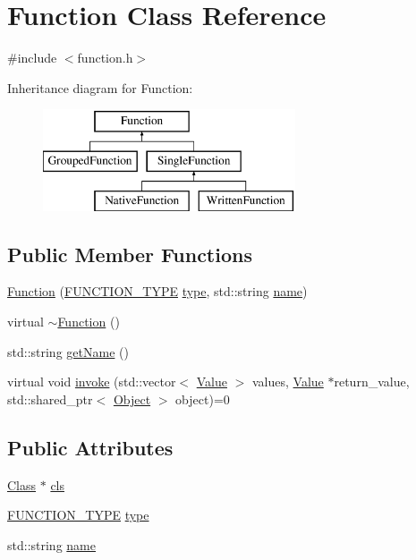 \hypertarget{classFunction}{}\section{Function Class Reference}
\label{classFunction}


{\ttfamily \#include $<$function.\+h$>$}

Inheritance diagram for Function\+:\begin{figure}[H]
\begin{center}
\leavevmode
\includegraphics[height=3.000000cm]{classFunction}
\end{center}
\end{figure}
\subsection*{Public Member Functions}
\begin{DoxyCompactItemize}
\item 
\hyperlink{classFunction_a3bcd0502247ea1545853f1f6126b5fe1}{Function} (\hyperlink{statics_8h_a025d9866e39f51183a23b3e2165f0e77}{F\+U\+N\+C\+T\+I\+O\+N\+\_\+\+T\+Y\+PE} \hyperlink{classFunction_a07d7969dbcf44a6a066c6e042a02983d}{type}, std\+::string \hyperlink{classFunction_a161d1ceb4f67f3222caf429fea7b71f1}{name})
\item 
virtual \hyperlink{classFunction_a8697b2e490a4314a7ccbb17aea8ce537}{$\sim$\+Function} ()
\item 
std\+::string \hyperlink{classFunction_a5b7d859d767e8a9c19fc5b81a0d10395}{get\+Name} ()
\item 
virtual void \hyperlink{classFunction_a84f9a63e68becc27e58ea738ba4cd698}{invoke} (std\+::vector$<$ \hyperlink{classValue}{Value} $>$ values, \hyperlink{classValue}{Value} $\ast$return\+\_\+value, std\+::shared\+\_\+ptr$<$ \hyperlink{classObject}{Object} $>$ object)=0
\end{DoxyCompactItemize}
\subsection*{Public Attributes}
\begin{DoxyCompactItemize}
\item 
\hyperlink{classClass}{Class} $\ast$ \hyperlink{classFunction_a1d7e4e5dc199ee4a771a3e5732ea379c}{cls}
\item 
\hyperlink{statics_8h_a025d9866e39f51183a23b3e2165f0e77}{F\+U\+N\+C\+T\+I\+O\+N\+\_\+\+T\+Y\+PE} \hyperlink{classFunction_a07d7969dbcf44a6a066c6e042a02983d}{type}
\item 
std\+::string \hyperlink{classFunction_a161d1ceb4f67f3222caf429fea7b71f1}{name}
\end{DoxyCompactItemize}


